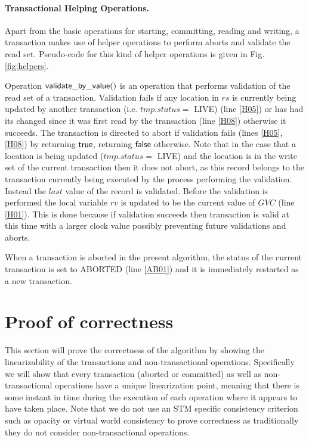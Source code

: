\paragraph{Transactional Helping Operations.} 
Apart from the basic operations for starting, committing, 
reading and writing, a transaction makes use of helper 
operations to perform aborts and validate the read set.
 Pseudo-code for this kind of helper operations 
is given in Fig. \ref{fig:helpers}.

Operation ${\sf validate\_by\_value()}$ is an operation that performs 
validation of the read set of a transaction. 
Validation fails 
if any location in $\mathit{rs}$ is 
currently being updated by another transaction (i.e. $\mathit{tmp.status} = $ LIVE) (line \ref{H05})
or has had its changed since it was first read by the transaction (line \ref{H08})
otherwise it succeeds.
The transaction is directed to abort if validation fails (lines \ref{H05}, \ref{H08}) by returning $\sf{true}$,
returning $\sf{false}$ otherwise.
Note that in the case that a location is being updated ($\mathit{tmp.status} = $ LIVE) and the location
is in the write set of the current transaction then it does not abort, as this record belongs to the transaction
currently being executed by the process performing the validation.
Instead the $\mathit{last}$ value of the record is validated.
Before the validation is performed the local variable $\mathit{rv}$ is updated
to be the current value of $\mathit{GVC}$ (line \ref{H01}).
This is done because if validation succeeds then transaction is valid at this time
with a larger
clock value possibly preventing future validations and aborts.

When a transaction is aborted in the present algorithm, 
the status of the current transaction is set to ABORTED (line \ref{AB01}) and
it is immediately restarted as a new transaction.





\section{Proof of correctness}
This section will prove the correctness of the algorithm by showing the linearizability
of the transactions and non-transactional operations.
Specifically we will show that every transaction (aborted or committed) as well
as non-transactional operations have a unique linearization point, meaning that
there is some instant in time during the execution of each operation where it
appears to have taken place.
Note that we do not use an STM specific consistency criterion
such as opacity or virtual world consistency to prove correctness as traditionally they do not consider
non-transactional operations.

